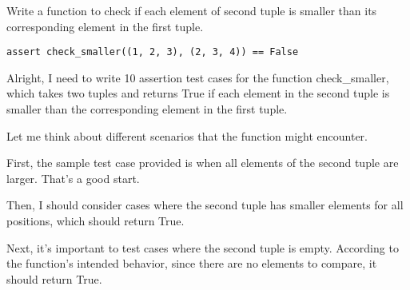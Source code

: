 
\begin{figure*}[ht!]
  \centering

\begin{tcolorbox}[title={Sample MBPP Question (MBPP Question 809)}, colback=red!0, left=2pt,right=2pt,top=2pt,bottom=2pt]

  { %

Write a function to check if each element of second tuple is smaller than its corresponding element in the first tuple.
  
\begin{verbatim}
assert check_smaller((1, 2, 3), (2, 3, 4)) == False
\end{verbatim}

  }
  \end{tcolorbox}

  \vspace{0.1in}

\begin{tcolorbox}[title={DeepSeek-R1-Distill-Qwen-32B Reasoning Trace}, colback=red!0, left=2pt,right=2pt,top=2pt,bottom=2pt]

{ %



Alright, I need to write 10 assertion test cases for the function check\_smaller, which takes two tuples and returns True if each element in the second tuple is smaller than the corresponding element in the first tuple. 

\vspace{0.3cm}

Let me think about different scenarios that the function might encounter. 

\vspace{0.3cm}

First, the sample test case provided is when all elements of the second tuple are larger. That's a good start. 

\vspace{0.3cm}

Then, I should consider cases where the second tuple has smaller elements for all positions, which should return True. 

\vspace{0.3cm}

Next, it's important to test cases where the second tuple is empty. According to the function's intended behavior, since there are no elements to compare, it should return True. 

\vspace{0.3cm}

}
\end{tcolorbox}
\end{figure*}
